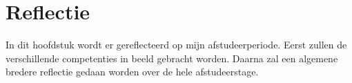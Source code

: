 \chapter{Reflectie}
In dit hoofdstuk wordt er gereflecteerd op mijn afstudeerperiode.
Eerst zullen de verschillende competenties in beeld gebracht worden.
Daarna zal een algemene bredere reflectie gedaan worden over de hele afstudeerstage.


\newpage


